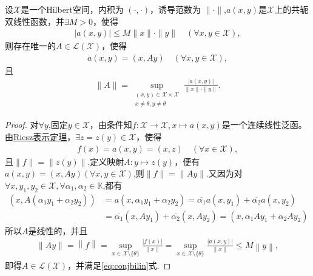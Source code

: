 \documentclass[../../main.tex]{subfiles}%
\begin{document}
\begin{theorem}\label{theorem:泛函分析--定理2.2.2}
设$\mathscr{X}$是一个Hilbert空间，内积为 $(\cdot,\cdot)$，诱导范数为 $\|\cdot\|$,$a(x,y)$是$\mathscr{X}$上的共轭双线性函数，并$\exists M>0$，使得
\begin{align*}
|a(x,y)|\leqslant M\|x\|\cdot\|y\|\quad (\forall x,y\in\mathscr{X}),
\end{align*}
则存在唯一的$A\in\mathscr{L}(\mathscr{X})$，使得
\begin{align*}
a(x,y)=(x,Ay)\quad (\forall x,y\in\mathscr{X}),
\end{align*}
且
\begin{align}
\|A\|=\sup_{\substack{(x,y)\in\mathscr{X}\times\mathscr{X} \\ x\neq\theta,y\neq\theta}} \frac{|a(x,y)|}{\|x\|\cdot\|y\|}.
\label{eq:conjbilin}
\end{align}
\end{theorem}
\begin{proof}
对$\forall y$,固定$y\in\mathscr{X}$，由条件知$f:\mathscr{X}\to \mathscr{X},x\mapsto a(x,y)$是一个连续线性泛函。由\hyperref[theorem:Riesz表示定理(Hilbert空间)]{Riesz表示定理}，$\exists z=z(y)\in\mathscr{X}$，使得
\begin{align*}
f(x)=a(x,y)=(x,z)\quad (\forall x\in\mathscr{X}),
\end{align*}
且$\|f\|=\|z(y)\|$.定义映射$A:y\mapsto z(y)$，便有$a(x,y)=(x,Ay)(\forall x,y\in\mathscr{X})$,则$\|f\|=\|Ay\|$.又因为对$\forall x,y_1,y_2\in\mathscr{X},\forall\alpha_1,\alpha_2\in\mathbb{K}$,都有
\begin{align*}
(x,A(\alpha_1y_1+\alpha_2y_2))&=a(x,\alpha_1y_1+\alpha_2y_2)
=\overline{\alpha_1}a(x,y_1)+\overline{\alpha_2}a(x,y_2)\\
&=\overline{\alpha_1}(x,Ay_1)+\overline{\alpha_2}(x,Ay_2)
=(x,\alpha_1Ay_1+\alpha_2Ay_2)
\end{align*}
所以$A$是线性的，并且
\begin{align*}
\left\| Ay \right\| =\left\| f \right\| =\mathop {\mathrm{sup}} \limits_{x\in \mathscr{X} \setminus \{\theta \}}\frac{\left| f\left( x \right) \right|}{\left\| x \right\|}=\mathop {\mathrm{sup}} \limits_{x\in \mathscr{X} \setminus \{\theta \}}\frac{\left| a\left( x,y \right) \right|}{\left\| x \right\|}\leqslant M\left\| y \right\| ,
\end{align*}
即得$A\in\mathscr{L}(\mathscr{X})$，并满足\eqref{eq:conjbilin}式.
\end{proof}
\end{document}
